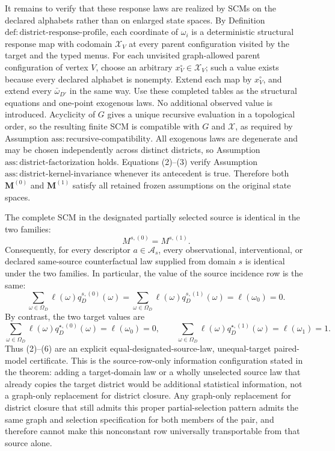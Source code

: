 It remains to verify that these response laws are realized by SCMs on the declared alphabets rather than on enlarged state spaces.  By Definition \(\mathrm{def:district\text{-}response\text{-}profile}\), each coordinate of \(\omega_i\) is a deterministic structural response map with codomain \(\mathcal X_V\) at every parent configuration visited by the target and the typed menus.  For each unvisited graph-allowed parent configuration of vertex \(V\), choose an arbitrary \(x_V^\circ\in\mathcal X_V\); such a value exists because every declared alphabet is nonempty.  Extend each map by \(x_V^\circ\), and extend every \(\bar\omega_{D'}\) in the same way.  Use these completed tables as the structural equations and one-point exogenous laws.  No additional observed value is introduced.  Acyclicity of \(G\) gives a unique recursive evaluation in a topological order, so the resulting finite SCM is compatible with \(G\) and \(\mathcal X\), as required by Assumption \(\mathrm{ass:recursive\text{-}compatibility}\).  All exogenous laws are degenerate and may be chosen independently across distinct districts, so Assumption \(\mathrm{ass:district\text{-}factorization}\) holds.  Equations (2)--(3) verify Assumption \(\mathrm{ass:district\text{-}kernel\text{-}invariance}\) whenever its antecedent is true.  Therefore both \(\mathbf M^{(0)}\) and \(\mathbf M^{(1)}\) satisfy all retained frozen assumptions on the original state spaces.

The complete SCM in the designated partially selected source is identical in the two families:
\[
M^{s,(0)}=M^{s,(1)}.
\tag{4}
\]
Consequently, for every descriptor \(a\in\mathcal A_s\), every observational, interventional, or declared same-source counterfactual law supplied from domain \(s\) is identical under the two families.  In particular, the value of the source incidence row is the same:
\[
\sum_{\omega\in\Omega_D}\ell(\omega)q_D^{s,(0)}(\omega)
=
\sum_{\omega\in\Omega_D}\ell(\omega)q_D^{s,(1)}(\omega)
=\ell(\omega_0)=0.
\tag{5}
\]
By contrast, the two target values are
\[
\sum_{\omega\in\Omega_D}\ell(\omega)q_D^{\star,(0)}(\omega)
=\ell(\omega_0)=0,
\qquad
\sum_{\omega\in\Omega_D}\ell(\omega)q_D^{\star,(1)}(\omega)
=\ell(\omega_1)=1.
\tag{6}
\]
Thus (2)--(6) are an explicit equal-designated-source-law, unequal-target paired-model certificate.  This is the source-row-only information configuration stated in the theorem: adding a target-domain law or a wholly unselected source law that already copies the target district would be additional statistical information, not a graph-only replacement for district closure.  Any graph-only replacement for district closure that still admits this proper partial-selection pattern admits the same graph and selection specification for both members of the pair, and therefore cannot make this nonconstant row universally transportable from that source alone.

